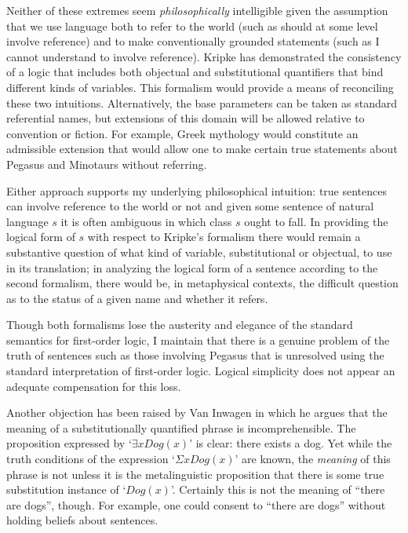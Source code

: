 Neither of these extremes seem \emph{philosophically} intelligible
given the assumption that we use language both to refer to the world
(such as should at some level involve reference) and to make
conventionally grounded statements (such as I cannot understand to
involve reference).  Kripke \cite{kripke} has demonstrated the
consistency of a logic that includes both objectual and substitutional
quantifiers that bind different kinds of variables. This formalism
would provide a means of reconciling these two intuitions.
Alternatively, the base parameters can be taken as standard
referential names, but extensions of this domain will be allowed
relative to convention or fiction.  For example, Greek mythology would
constitute an admissible extension that would allow one to make
certain true statements about Pegasus and Minotaurs without referring.

Either approach supports my underlying philosophical intuition: true
sentences can involve reference to the world or not and given some
sentence of natural language $s$ it is often ambiguous in which class
$s$ ought to fall.  In providing the logical form of $s$ with respect
to Kripke's formalism there would remain a substantive question of
what kind of variable, substitutional or objectual, to use in its
translation; in analyzing the logical form of a sentence according to
the second formalism, there would be, in metaphysical contexts,
the difficult question as to the status of a given name and whether it
refers.

Though both formalisms lose the austerity and elegance of the standard
semantics for first-order logic, I maintain that there is a genuine
problem of the truth of sentences such as those involving Pegasus that
is unresolved using the standard interpretation of first-order logic.
Logical simplicity does not appear an adequate compensation for this
loss.

Another objection has been raised by Van Inwagen \cite{inwagen} in
which he argues that the meaning of a substitutionally quantified
phrase is incomprehensible.  The proposition expressed by `$\exists
xDog(x)$' is clear: there exists a dog. Yet while the truth conditions
of the expression `$\Sigma xDog(x)$' are known, the \emph{meaning} of
this phrase is not unless it is the metalinguistic proposition that
there is some true substitution instance of `$Dog(x)$'.  Certainly this
is not the meaning of ``there are dogs'', though.  For example, one
could consent to ``there are dogs'' without holding beliefs about
sentences.

